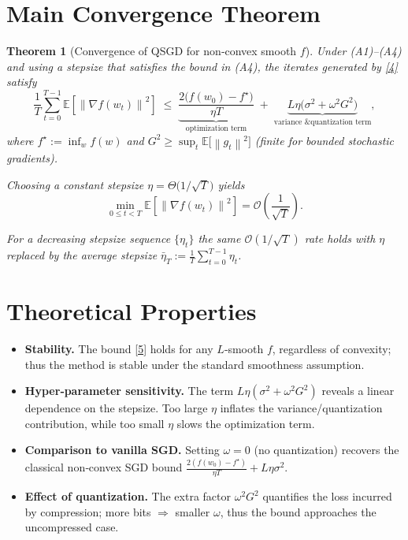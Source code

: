 \documentclass{article}
\newtheorem{theorem}{Theorem}
\newcommand{\E}{\mathbb{E}}
\newcommand{\norm}[1]{\left\lVert#1\right\rVert}
\begin{document}
\section*{Main Convergence Theorem}
\begin{theorem}[Convergence of QSGD for non‑convex smooth $f$]\label{thm:main}
Under (A1)–(A4) and using a stepsize that satisfies the bound in (A4), the iterates generated by \eqref{4} satisfy
\[
\frac{1}{T}\sum_{t=0}^{T-1}\E\!\left[\norm{\nabla f(w_{t})}^{2}\right]
\;\le\;
\underbrace{\frac{2\bigl(f(w_{0})-f^{\star}\bigr)}{\eta T}}_{\text{optimization term}}
\;+\;
\underbrace{L\eta\bigl(\sigma^{2}+\omega^{2}G^{2}\bigr)}_{\text{variance \& quantization term}},
\tag{5}
\]
where $f^{\star}:=\inf_{w}f(w)$ and $G^{2}\ge \sup_{t}\E\!\bigl[\norm{g_{t}}^{2}\bigr]$ (finite for bounded stochastic gradients).  

Choosing a constant stepsize $\eta = \Theta\!\bigl(1/\sqrt{T}\bigr)$ yields
\[
\min_{0\le t<T}\E\!\left[\norm{\nabla f(w_{t})}^{2}\right]=\mathcal{O}\!\left(\frac{1}{\sqrt{T}}\right).
\]

For a decreasing stepsize sequence $\{\eta_{t}\}$ the same $\mathcal{O}(1/\sqrt{T})$ rate holds with $\eta$ replaced by the average stepsize $\bar\eta_{T}:=\frac{1}{T}\sum_{t=0}^{T-1}\eta_{t}$.
\end{theorem}

\section*{Theoretical Properties}
\begin{itemize}
\item \textbf{Stability.} The bound \eqref{5} holds for any $L$‑smooth $f$, regardless of convexity; thus the method is stable under the standard smoothness assumption.
\item \textbf{Hyper‑parameter sensitivity.} The term $L\eta(\sigma^{2}+\omega^{2}G^{2})$ reveals a linear dependence on the stepsize. Too large $\eta$ inflates the variance/quantization contribution, while too small $\eta$ slows the optimization term.
\item \textbf{Comparison to vanilla SGD.} Setting $\omega=0$ (no quantization) recovers the classical non‑convex SGD bound $\frac{2(f(w_{0})-f^{\star})}{\eta T}+L\eta\sigma^{2}$.
\item \textbf{Effect of quantization.} The extra factor $\omega^{2}G^{2}$ quantifies the loss incurred by compression; more bits $\Rightarrow$ smaller $\omega$, thus the bound approaches the uncompressed case.
\end{itemize}
\end{document}
